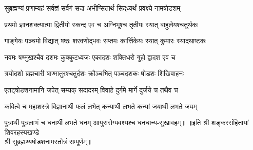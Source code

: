 
\twolineshloka
{सुब्रह्मण्यं प्रणाम्यहं सर्वज्ञं सर्वगं सदा}
{अभीप्सितार्थ-सिद्‌ध्यर्थं प्रवक्ष्ये नामषोडशम्}

\twolineshloka
{प्रथमो ज्ञानशक्त्यात्मा द्वितीयो स्कन्द एव च}
{अग्निभूश्च तृतीयः स्यात् बाहुलेयश्चतुर्थकः}

\twolineshloka
{गाङ्गेयः पञ्चमो विद्यात् षष्ठः शरवणोद्भवः}
{सप्तमः कार्त्तिकेयः स्यात् कुमारः स्यादथाष्टकः}

\twolineshloka
{नवमः षण्मुखश्चैव दशमः कुक्कुटध्वजः}
{एकादशः शक्तिधरो गुहो द्वादश एव च}

\twolineshloka
{त्रयोदशो ब्रह्मचारी षाण्मातुरश्चतुर्दशः}
{क्रौञ्चभित् पञ्चदशकः षोडशः शिखिवाहनः}

\twolineshloka
{एतट्षोडशनामानि जपेत् सम्यक् सदादरम्}
{विवाहे दुर्गमे मार्गे दुर्जये च तथैव च}

\twolineshloka
{कवित्वे च महाशस्त्रे विज्ञानार्थी फलं लभेत्}
{कन्यार्थी लभते कन्यां जयार्थी लभते जयम्}

\twolineshloka
{पुत्रार्थी पुत्रलाभं  च धनार्थी लभते धनम्}
{आयुरारोग्यवश्यश्च धनधान्य-सुखावहम्॥}
॥इति श्री शङ्करसंहितायां शिवरहस्यखण्डे\\
श्री सुब्रह्मण्यषोडशनामस्तोत्रं सम्पूर्णम्॥